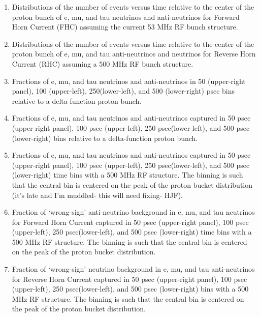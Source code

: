 \documentclass[12pt]{article}
\begin{document}
\begin{enumerate}
\item Distributions of the number of events versus time relative to
  the center of the proton bunch of e, mu, and tau neutrinos and
  anti-neutrinos for Forward Horn Current (FHC) assuming the current
  53 MHz RF bunch structure.

\item Distributions of the number of events versus time relative to
  the center of the proton bunch of e, mu, and tau anti-neutrinos and
  neutrinos for Reverse Horn Current (RHC) assuming a 500 MHz RF bunch
  structure.

\item Fractions of e, mu, and tau neutrinos and anti-neutrinos in 50
(upper-right panel), 100 (upper-left), 250(lower-left), and 500
(lower-right) psec bins relative to a delta-function proton bunch.

\item Fractions of e, mu, and tau neutrinos and anti-neutrinos captured
in 50 psec (upper-right panel), 100 psec (upper-left), 250
psec(lower-left), and 500 psec (lower-right) bins relative to a
delta-function proton bunch.

\item Fractions of e, mu, and tau neutrinos and anti-neutrinos
  captured in 50 psec (upper-right panel), 100 psec (upper-left), 250
  psec(lower-left), and 500 psec (lower-right) time bins with a 500
  MHz RF structure. The binning is such that the central bin is
  centered on the peak of the proton bucket distribution (it's late
  and I'm muddled- this will need fixing- HJF).

\item Fraction of `wrong-sign' anti-neutrino background in e, mu, and
tau neutrinos for Forward Horn Current captured in 50 psec
(upper-right panel), 100 psec (upper-left), 250 psec(lower-left), and
500 psec (lower-right) time bins with a 500
MHz RF structure. The binning is such that the central bin is
  centered on the peak of the proton bucket distribution.


\item Fraction of `wrong-sign' neutrino background in e, mu, and tau
  anti-neutrinos for Reverse Horn Current captured in 50 psec
  (upper-right panel), 100 psec (upper-left), 250 psec(lower-left),
  and 500 psec (lower-right) bins with a 500 MHz RF structure. The
  binning is such that the central bin is centered on the peak of the
  proton bucket distribution.



\end{enumerate}
\end{document}
